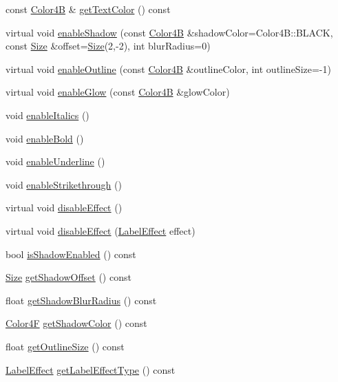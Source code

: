 \begin{DoxyCompactItemize}
\item 
const \hyperlink{structColor4B}{Color4B} \& \hyperlink{classLabel_adb4e491a31a5c09c9ceb23a41797148a}{get\+Text\+Color} () const
\item 
virtual void \hyperlink{classLabel_abb062f4e6a0b7b4bc50bdc6b600a5d5c}{enable\+Shadow} (const \hyperlink{structColor4B}{Color4B} \&shadow\+Color=Color4\+B\+::\+B\+L\+A\+CK, const \hyperlink{classSize}{Size} \&offset=\hyperlink{classSize}{Size}(2,-\/2), int blur\+Radius=0)
\item 
virtual void \hyperlink{classLabel_a1dcf7a3bc06dfbfdf858cd45bbc8c4de}{enable\+Outline} (const \hyperlink{structColor4B}{Color4B} \&outline\+Color, int outline\+Size=-\/1)
\item 
virtual void \hyperlink{classLabel_a209fd3cf08d9ae26bda7c91f9b4c67a8}{enable\+Glow} (const \hyperlink{structColor4B}{Color4B} \&glow\+Color)
\item 
void \hyperlink{classLabel_a95ad191f37a92e4a72013cd4183726fe}{enable\+Italics} ()
\item 
void \hyperlink{classLabel_a2b89abd6d8c0d225e9271e0a7f46b315}{enable\+Bold} ()
\item 
void \hyperlink{classLabel_af8dd37db2a2bf06ef6114ddbcb77845d}{enable\+Underline} ()
\item 
void \hyperlink{classLabel_accb5df5cb55d97d516d90489aafff1fb}{enable\+Strikethrough} ()
\item 
virtual void \hyperlink{classLabel_a9991f8f752452ac697b1935d1be47c9f}{disable\+Effect} ()
\item 
virtual void \hyperlink{classLabel_a7c741a17efc7dfb0949a91ea00f03b7a}{disable\+Effect} (\hyperlink{group__base_ga26fd049ca5303e0cf4435208058f32e4}{Label\+Effect} effect)
\item 
bool \hyperlink{classLabel_ada5f28d2fbfcb18862890be2b36fd1d8}{is\+Shadow\+Enabled} () const
\item 
\hyperlink{classSize}{Size} \hyperlink{classLabel_a46496ccac5e3a936cb0008db68a0e91e}{get\+Shadow\+Offset} () const
\item 
float \hyperlink{classLabel_a6d187422565a9368e03e1f71e39efbd3}{get\+Shadow\+Blur\+Radius} () const
\item 
\hyperlink{structColor4F}{Color4F} \hyperlink{classLabel_a5a17b13a523cd53169bf248cfd45c776}{get\+Shadow\+Color} () const
\item 
float \hyperlink{classLabel_a0c123c000a66417e27562a3e983c6872}{get\+Outline\+Size} () const
\item 
\hyperlink{group__base_ga26fd049ca5303e0cf4435208058f32e4}{Label\+Effect} \hyperlink{classLabel_a36187b9d07b216314adb4d4f2fad34d2}{get\+Label\+Effect\+Type} () const

\end{DoxyCompactItemize}
